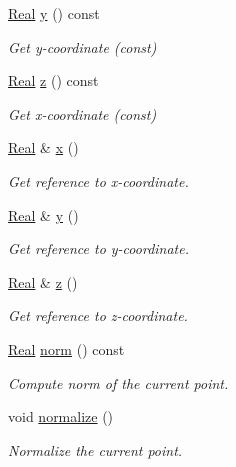 \begin{DoxyCompactItemize}
\hyperlink{namespaceFVCode3D_a40c1f5588a248569d80aa5f867080e83}{Real} \hyperlink{classFVCode3D_1_1Point3D_a950abcabbf3bb32fc2daf64c28d77416}{y} () const 
\begin{DoxyCompactList}\small\item\em Get y-\/coordinate (const) \end{DoxyCompactList}\item 
\hyperlink{namespaceFVCode3D_a40c1f5588a248569d80aa5f867080e83}{Real} \hyperlink{classFVCode3D_1_1Point3D_a865109e2006cc1de3681ab601081f5aa}{z} () const 
\begin{DoxyCompactList}\small\item\em Get x-\/coordinate (const) \end{DoxyCompactList}\item 
\hyperlink{namespaceFVCode3D_a40c1f5588a248569d80aa5f867080e83}{Real} \& \hyperlink{classFVCode3D_1_1Point3D_acfeb3c442958a0e127041daf22418626}{x} ()
\begin{DoxyCompactList}\small\item\em Get reference to x-\/coordinate. \end{DoxyCompactList}\item 
\hyperlink{namespaceFVCode3D_a40c1f5588a248569d80aa5f867080e83}{Real} \& \hyperlink{classFVCode3D_1_1Point3D_ad2bdad9fb491be7b904267315dd9e032}{y} ()
\begin{DoxyCompactList}\small\item\em Get reference to y-\/coordinate. \end{DoxyCompactList}\item 
\hyperlink{namespaceFVCode3D_a40c1f5588a248569d80aa5f867080e83}{Real} \& \hyperlink{classFVCode3D_1_1Point3D_abcea334e05978fd0e91db2283afd1695}{z} ()
\begin{DoxyCompactList}\small\item\em Get reference to z-\/coordinate. \end{DoxyCompactList}\item 
\hyperlink{namespaceFVCode3D_a40c1f5588a248569d80aa5f867080e83}{Real} \hyperlink{classFVCode3D_1_1Point3D_ac9e4bf311b24cea10ad3fde1d703be01}{norm} () const 
\begin{DoxyCompactList}\small\item\em Compute norm of the current point. \end{DoxyCompactList}\item 
void \hyperlink{classFVCode3D_1_1Point3D_a0d1cd3d114b0985ae2b11cd1c52de673}{normalize} ()
\begin{DoxyCompactList}\small\item\em Normalize the current point. \end{DoxyCompactList}\item 

\end{DoxyCompactItemize}
